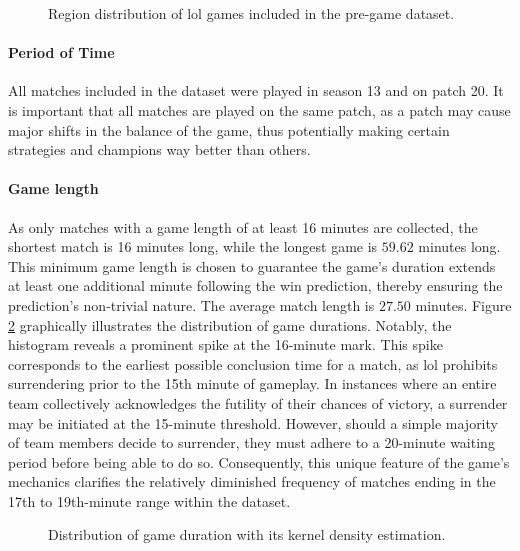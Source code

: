 \documentclass[12pt, a4paper, headinclude, twoside, plainheadsepline, open=right, numbers=noenddot, hidelinks, toc=listof, toc=bibliography]{scrreprt}
\begin{document}
\begin{figure}[htbp]

\caption{Region distribution of \ac{lol} games included in the pre-game dataset.}
\label{fig:platformId}
\end{figure}

\paragraph{Period of Time}
All matches included in the dataset were played in season 13 and on patch 20.
It is important that all matches are played on the same patch, as a patch may cause major shifts in the balance of the game, thus potentially making certain strategies and champions way better than others.

\paragraph{Game length}
As only matches with a game length of at least 16 minutes are collected, the shortest match is 16 minutes long, while the longest game is $59.62$ minutes long.
This minimum game length is chosen to guarantee the game's duration extends at least one additional minute following the win prediction, thereby ensuring the prediction's non-trivial nature.
The average match length is $27.50$ minutes.
Figure \ref{fig:gameDuration} graphically illustrates the distribution of game durations. 
Notably, the histogram reveals a prominent spike at the 16-minute mark.
This spike corresponds to the earliest possible conclusion time for a match, as \ac{lol} prohibits surrendering prior to the 15th minute of gameplay. 
In instances where an entire team collectively acknowledges the futility of their chances of victory, a surrender may be initiated at the 15-minute threshold.
However, should a simple majority of team members decide to surrender, they must adhere to a 20-minute waiting period before being able to do so. 
Consequently, this unique feature of the game's mechanics clarifies the relatively diminished frequency of matches ending in the 17th to 19th-minute range within the dataset.

\begin{figure}[htbp]

\caption{Distribution of game duration with its kernel density estimation.}
\label{fig:gameDuration}
\end{figure}
\end{document}
